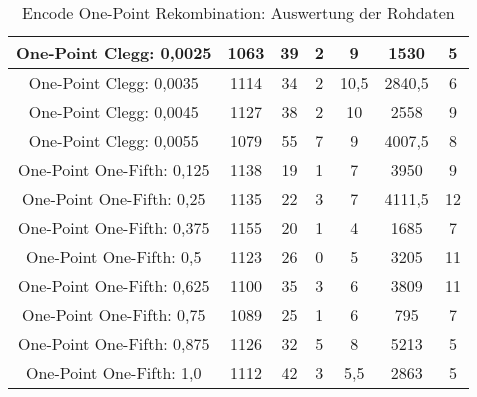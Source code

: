 \begin{table}[H]
\begin{tabular}{c | c | c | c | c | c | c}
		\hline
		One-Point Clegg: 0,0025 & 1063 & 39 & 2 & 9 & 1530 & 5\\
		\hline
		One-Point Clegg: 0,0035 & 1114 & 34 & 2 & 10,5 & 2840,5 & 6\\
		\hline
		One-Point Clegg: 0,0045 & 1127 & 38 & 2 & 10 & 2558 & 9\\
		\hline
		One-Point Clegg: 0,0055 & 1079 & 55 & 7 & 9 & 4007,5 & 8\\
		\hline
		\hline
		One-Point One-Fifth: 0,125 & 1138 & 19 & 1 & 7 & 3950 & 9\\
		\hline
		One-Point One-Fifth: 0,25 & 1135 & 22 & 3 & 7 & 4111,5 & 12\\
		\hline
		One-Point One-Fifth: 0,375 & 1155 & 20 & 1 & 4 & 1685 & 7\\
		\hline
		One-Point One-Fifth: 0,5 & 1123 & 26 & 0 & 5 & 3205 & 11\\
		\hline
		One-Point One-Fifth: 0,625 & 1100 & 35 & 3 & 6 & 3809 & 11\\
		\hline
		One-Point One-Fifth: 0,75 & 1089 & 25 & 1 & 6 & 795 & 7\\
		\hline
		One-Point One-Fifth: 0,875 & 1126 & 32 & 5 & 8 & 5213 & 5\\
		\hline
		One-Point One-Fifth: 1,0 & 1112 & 42 & 3 & 5,5 & 2863 & 5\\
	\end{tabular}
	\caption{Encode One-Point Rekombination: Auswertung der Rohdaten}
	\label{table:encodeOnePointRohdaten}
\end{table} 
